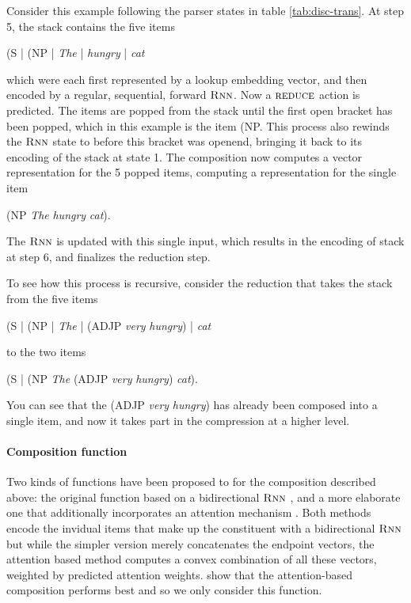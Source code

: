 Consider this example following the parser states in table \ref{tab:disc-trans}. At step 5, the stack contains the five items
\begin{center}
  (S | (NP | \textit{The} | \textit{hungry} | \textit{cat}
\end{center}
which were each first represented by a lookup embedding vector, and then encoded by a regular, sequential, forward $\textsc{Rnn}$. Now a $\textsc{reduce}$ action is predicted. The items are popped from the stack until the first open bracket has been popped, which in this example is the item (NP. This process also rewinds the $\textsc{Rnn}$ state to before this bracket was openend, bringing it back to its encoding of the stack at state 1. The composition now computes a vector representation for the 5 popped items, computing a representation for the single item
\begin{center}
  (NP \textit{The} \textit{hungry} \textit{cat}).
\end{center}
The $\textsc{Rnn}$ is updated with this single input, which results in the encoding of stack at step 6, and finalizes the reduction step.

To see how this process is recursive, consider the reduction that takes the stack from the five items
\begin{center}
  (S | (NP | \textit{The} | (ADJP \textit{very} \textit{hungry}) | \textit{cat}
\end{center}
to the two items
\begin{center}
  (S | (NP \textit{The} (ADJP \textit{very} \textit{hungry}) \textit{cat}).
\end{center}
You can see that the (ADJP \textit{very} \textit{hungry}) has already been composed into a single item, and now it takes part in the compression at a higher level.

\paragraph{Composition function} Two kinds of functions have been proposed to for the composition described above: the original function based on a bidirectional $\textsc{Rnn}$ \citep{dyer2016rnng}, and a more elaborate one that additionally incorporates an attention mechanism \citep{kuncoro2017syntax}. Both methods encode the invidual items that make up the constituent with a bidirectional $\textsc{Rnn}$ but while the simpler version merely concatenates the endpoint vectors, the attention based method computes a convex combination of all these vectors, weighted by predicted attention weights. \citet{kuncoro2017syntax} show that the attention-based composition performs best and so we only consider this function.

